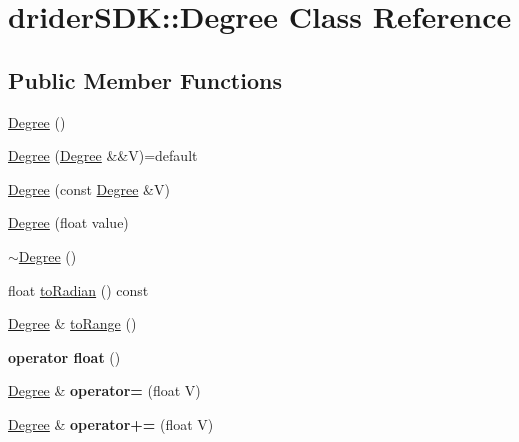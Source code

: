 \hypertarget{classdrider_s_d_k_1_1_degree}{}\section{drider\+S\+DK\+:\+:Degree Class Reference}
\label{classdrider_s_d_k_1_1_degree}
\subsection*{Public Member Functions}
\begin{DoxyCompactItemize}
\item 
\hyperlink{classdrider_s_d_k_1_1_degree_aa02a04e5e7f0c5d15e4362bfc2022286}{Degree} ()
\item 
\hyperlink{classdrider_s_d_k_1_1_degree_ab8798b0761abe03fd0d28abbac62a17c}{Degree} (\hyperlink{classdrider_s_d_k_1_1_degree}{Degree} \&\&V)=default
\item 
\hyperlink{classdrider_s_d_k_1_1_degree_a94a3842a811edb51f578d4f6da487e3b}{Degree} (const \hyperlink{classdrider_s_d_k_1_1_degree}{Degree} \&V)
\item 
\hyperlink{classdrider_s_d_k_1_1_degree_ada0c9ad7f00c36d1209fc1e7794911d7}{Degree} (float value)
\item 
\hyperlink{classdrider_s_d_k_1_1_degree_a44a8904fbd4178de2916c2b54883c1e1}{$\sim$\+Degree} ()
\item 
float \hyperlink{classdrider_s_d_k_1_1_degree_a5904a76d6c28c10ca432ee46db1997a8}{to\+Radian} () const
\item 
\hyperlink{classdrider_s_d_k_1_1_degree}{Degree} \& \hyperlink{classdrider_s_d_k_1_1_degree_a1dedd27ddf700baf9c6f706888e81d0a}{to\+Range} ()
\item 
\mbox{\label{classdrider_s_d_k_1_1_degree_abf1e9a263d6e3acaebd79f1f1f6e4791}} 
{\bfseries operator float} ()
\item 
\mbox{\label{classdrider_s_d_k_1_1_degree_a4320abb846750e3ea3de34895e56dc03}} 
\hyperlink{classdrider_s_d_k_1_1_degree}{Degree} \& {\bfseries operator=} (float V)
\item 
\mbox{\label{classdrider_s_d_k_1_1_degree_a06e5895da5d163da2753a7f05f3e3e56}} 
\hyperlink{classdrider_s_d_k_1_1_degree}{Degree} \& {\bfseries operator+=} (float V)
\item 

\end{DoxyCompactItemize}
